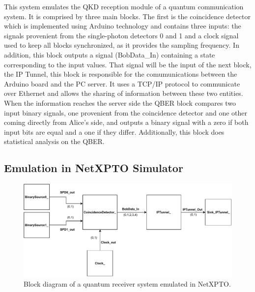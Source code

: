 \begin{refsection}
This system emulates the QKD reception module of a quantum communication system. It is comprised by three main blocks. The first is the coincidence detector  which is implemented using Arduino technology and contains three inputs: the signals provenient from the single-photon detectors 0 and 1 and a clock signal used to keep all blocks synchronized, as it provides the sampling frequency. In addition, this block outputs a signal (BobData\_In) containing a state corresponding to the input values. That signal will be the input of the next block, the IP Tunnel, this block is responsible for the comumunications between the Arduino board and the PC server. It uses a TCP/IP protocol to communicate over Ethernet and allows the sharing of information between these two entities. When the information reaches the server side the QBER block compares two input binary signals, one provenient from the coincidence detector and one other coming directly from Alice's side, and outputs a binary signal with a zero if both input bits are equal and a one if they differ. Additionally, this block does statistical analysis on the QBER.  

\subsection{Emulation in NetXPTO Simulator}

\vspace{11pt}

\begin{figure}[H]
	\centering
	\includegraphics[width=0.9\linewidth]{./sdf/arduino_quantum_rx/figures/NetXPTO_implementation.pdf}
	\caption{Block diagram of a quantum receiver system emulated in NetXPTO.}
	\label{fig:netxpto}
\end{figure}


\end{refsection}
